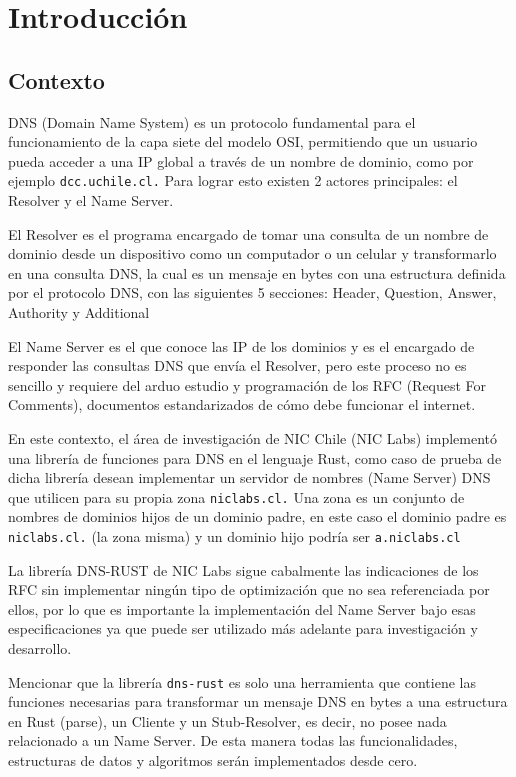 \chapter{Introducción}

\section{Contexto}

DNS (Domain Name System) es un protocolo fundamental para el funcionamiento de la capa siete del modelo OSI, permitiendo que un usuario pueda 
acceder a una IP global a través de un nombre de dominio, como por ejemplo \texttt{dcc.uchile.cl.} Para lograr esto existen 2 actores principales: 
el Resolver y el Name Server.

El Resolver es el programa encargado de tomar una consulta de un nombre de dominio desde un dispositivo como un computador o un celular y 
transformarlo en una consulta DNS, la cual es un mensaje en bytes con una estructura definida por el protocolo DNS, con las siguientes 5 
secciones: Header, Question, Answer, Authority y Additional

El Name Server es el que conoce las IP de los dominios y es el encargado de responder las consultas DNS que envía el Resolver, pero este proceso
no es sencillo y requiere del arduo estudio y programación de los RFC (Request For Comments), documentos estandarizados de cómo debe funcionar 
el internet.

En este contexto, el área de investigación de NIC Chile (NIC Labs) implementó una librería de funciones para DNS en el lenguaje Rust, como 
caso de prueba de dicha librería desean implementar un servidor de nombres (Name Server) DNS que utilicen para su propia zona \texttt{niclabs.cl.}
Una zona es un conjunto de nombres de dominios hijos de un dominio padre, en este caso el dominio padre es \texttt{niclabs.cl.} (la zona misma) y un dominio hijo podría ser 
\texttt{a.niclabs.cl}

La librería DNS-RUST  de NIC Labs sigue cabalmente las indicaciones de los RFC sin implementar ningún tipo de optimización que no sea 
referenciada por ellos, por lo que es importante la implementación del Name Server bajo esas especificaciones ya que puede ser utilizado 
más adelante para investigación y desarrollo.

Mencionar que la librería \texttt{dns-rust} es solo una herramienta que contiene las funciones necesarias para transformar un mensaje DNS en bytes a 
una estructura en Rust (parse), un Cliente y un Stub-Resolver, es decir, no posee nada relacionado a un Name Server. De esta manera todas las 
funcionalidades, estructuras de datos y algoritmos serán implementados desde cero. 

